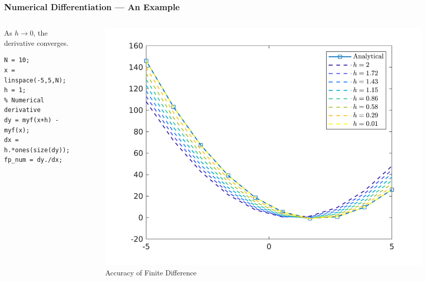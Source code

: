 \documentclass[11pt,xcolor={svgnames},aspectratio=169,usepdftitle=false]{beamer}
\begin{document}
\begin{frame}[fragile]
  \frametitle{Numerical Differentiation --- An Example}
\begin{columns}
\begin{column}{0.38\textwidth}
{\footnotesize As $h\rightarrow 0$, the derivative converges.}
\begin{lstlisting}
N = 10;
x = linspace(-5,5,N);
h = 1;
% Numerical derivative
dy = myf(x+h) - myf(x);
dx = h.*ones(size(dy));
fp_num = dy./dx;
\end{lstlisting}
\end{column}
\begin{column}{0.61\textwidth}
  \begin{figure}
    \centering
    \includegraphics[width = \textwidth]{../figures/finite_differences.png}
    \caption{Accuracy of Finite Difference}
    \label{fig:finite_differences}
  \end{figure}
\end{column}
\end{columns}
\end{frame}
\end{document}
